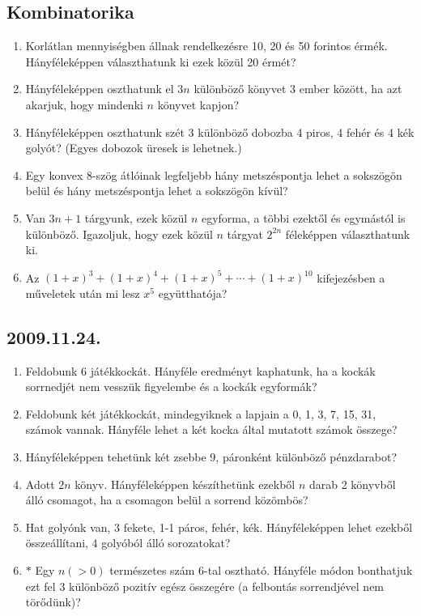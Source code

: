 \subsection*{Kombinatorika}
\begin{enumerate}
\item Korlátlan mennyiségben állnak rendelkezésre 10, 20 és 50 forintos érmék. Hányféleképpen választhatunk ki ezek közül 20 érmét?
\item Hányféleképpen oszthatunk el $3n$ különböző könyvet 3 ember között, ha azt akarjuk, hogy mindenki $n$ könyvet kapjon?
\item Hányféleképpen oszthatunk szét 3 különböző dobozba 4 piros, 4 fehér és 4 kék golyót? (Egyes dobozok üresek is lehetnek.)
\item Egy konvex 8-szög átlóinak legfeljebb hány metszéspontja lehet a sokszögön belül és hány metszéspontja lehet a sokszögön kívül?
\item Van $3n+1$ tárgyunk, ezek közül $n$ egyforma, a többi ezektől és egymástól is különböző. Igazoljuk, hogy ezek közül $n$ tárgyat $2^{2n}$ féleképpen választhatunk ki.
\item Az $(1+x)^3+(1+x)^4+(1+x)^5+\cdots +(1+x)^{10}$ kifejezésben a műveletek után mi lesz $x^5$ együtthatója?
\end{enumerate}

\subsection*{2009.11.24.}
\begin{enumerate}
\item Feldobunk 6 játékkockát. Hányféle eredményt kaphatunk, ha a kockák sorrnedjét nem vesszük figyelembe és a kockák egyformák?
\item Feldobunk két játékkockát, mindegyiknek a lapjain a 0, 1, 3, 7, 15, 31, számok vannak. Hányféle  lehet a két kocka által mutatott számok összege?
\item Hányféleképpen tehetünk két zsebbe 9, páronként különböző pénzdarabot?
\item Adott $2n$ könyv. Hányféleképpen készíthetünk ezekből $n$ darab 2 könyvből álló csomagot, ha a csomagon belül a sorrend közömbös?
\item Hat golyónk van, 3 fekete, 1-1 páros, fehér, kék. Hányféleképpen lehet ezekből összeállítani, 4 golyóból álló sorozatokat?
\item $*$ Egy $n(>0)$ természetes szám 6-tal osztható. Hányféle módon bonthatjuk ezt fel 3 különböző pozitív egész összegére (a felbontás sorrendjével nem törődünk)?
\end{enumerate}

